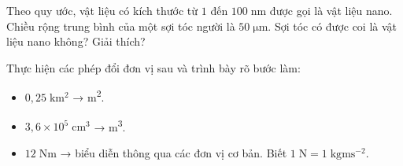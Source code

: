\begin{ex}
	Theo quy ước, vật liệu có kích thước từ \(1\) đến \(100\;\si{\nano\meter}\) được gọi là vật liệu nano. Chiều rộng trung bình của một sợi tóc người là \(50\;\si{\micro\meter}\). Sợi tóc có được coi là vật liệu nano không? Giải thích?
\end{ex}

\begin{ex}
	Thực hiện các phép đổi đơn vị sau và trình bày rõ bước làm:
	\begin{itemize}
		\item \(0{,}25\;\si{\kilo\meter^{2}}\) → \si{\meter^{2}}.
		\item \(3{,}6\times10^{5}\;\si{\centi\meter^{3}}\) → \si{\meter^{3}}.
		\item \(12\;\si{\newton\meter}\) → biểu diễn thông qua các đơn vị cơ bản. Biết \(1\;\si{\newton} = 1\;\si{\kilogram\meter\second^{-2}}\).
	\end{itemize}
\end{ex}

